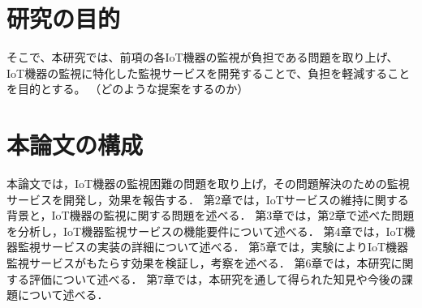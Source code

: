 \section{研究の目的}%
そこで、本研究では、前項の各IoT機器の監視が負担である問題を取り上げ、IoT機器の監視に特化した監視サービスを開発することで、負担を軽減することを目的とする。
（どのような提案をするのか）
\begin{comment}
そこで、前述の課題を解決するために、新規に監視サービスを開発し、IoT機器から通知を送ることにより、IoT機器の監視における困難を軽減することを目的とする。
IoT機器が自身の過去の動作状態や通信状態を記録することで，設置されるネットワークに関係なく状態監視をすることを可能にする．
また，サービスを機器監視に特化させ独立させることで，IoTサービスに変更を与えること無く，機器を監視することを可能にする．
この仕組みを用いることで，IoT機器が設置されるネットワークに関係無く状態を監視することや，IoT機器監視の設定の簡略化や、IoTサービスに組み込む負担の軽減を行う。
本研究では，IoT機器からの通知による機器の設置環境によらない機器の監視を行うことにより，IoTサービスの維持を容易にするシステムの開発に取り組む．
\end{comment}

\section{本論文の構成}%
本論文では，IoT機器の監視困難の問題を取り上げ，その問題解決のための監視サービスを開発し，効果を報告する．
第2章では，IoTサービスの維持に関する背景と，IoT機器の監視に関する問題を述べる．
第3章では，第2章で述べた問題を分析し，IoT機器監視サービスの機能要件について述べる．
第4章では，IoT機器監視サービスの実装の詳細について述べる．
第5章では，実験によりIoT機器監視サービスがもたらす効果を検証し，考察を述べる．
第6章では，本研究に関する評価について述べる．
第7章では，本研究を通して得られた知見や今後の課題について述べる．


